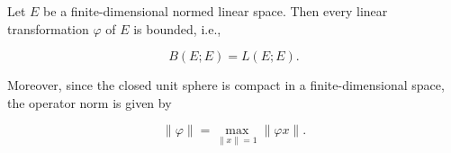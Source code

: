 Let $E$ be a finite-dimensional normed linear space. Then every linear transformation $\varphi$ of $E$ is bounded, i.e.,

$$B(E; E) = L(E; E).$$

Moreover, since the closed unit sphere is compact in a finite-dimensional space, the operator norm is given by

$$\|\varphi\| = \max_{\|x\| = 1} \|\varphi x\|.$$
